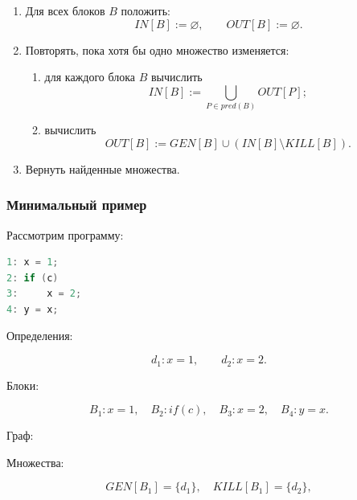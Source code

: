 \documentclass[12pt,a4paper]{article}
\begin{document}
\begin{enumerate}
  \item Для всех блоков $B$ положить:
  \[
  IN[B] := \varnothing,\qquad OUT[B] := \varnothing.
  \]
  \item Повторять, пока хотя бы одно множество изменяется:
  \begin{enumerate}
    \item для каждого блока $B$ вычислить
    \[
    IN[B] := \bigcup_{P \in pred(B)} OUT[P];
    \]
    \item вычислить
    \[
    OUT[B] := GEN[B] \cup (IN[B] \setminus KILL[B]).
    \]
  \end{enumerate}
  \item Вернуть найденные множества.
\end{enumerate}

\subsubsection{Минимальный пример}

Рассмотрим программу:

\begin{lstlisting}[language=C]
1: x = 1;
2: if (c)
3:     x = 2;
4: y = x;
\end{lstlisting}

Определения:

\[
d_1: x = 1,\qquad d_2: x = 2.
\]

Блоки:

\[
B_1: x=1,\quad B_2: if(c),\quad B_3: x=2,\quad B_4: y=x.
\]

Граф:

\begin{center}
\end{center}

Множества:

\[
GEN[B_1]=\{d_1\}, \quad KILL[B_1]=\{d_2\},
\]
\end{document}
